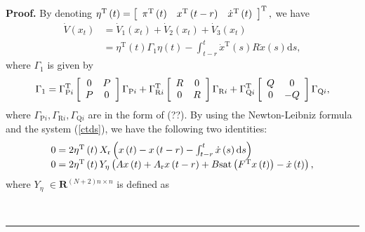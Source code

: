 \documentclass[9pt]{article}%
\newenvironment{proof}[1][Proof]{\noindent \textbf{#1.} }{\  \rule{0.5em}{0.5em}}
\begin{document}
\begin{proof}
By denoting $\eta^{\mathrm{T}}\left(  t\right)  =\left[
\begin{array}
[c]{ccc}%
\pi^{\mathrm{T}}\left(  t\right)  & x^{\mathrm{T}}\left(  t-r\right)  &
\dot{x}^{\mathrm{T}}\left(  t\right)
\end{array}
\right]  ^{\mathrm{T}},$ we have%
\begin{align}
\dot{V}\left(  x_{t}\right)   &  =\dot{V}_{1}\left(  x_{t}\right)  +\dot
{V}_{2}\left(  x_{t}\right)  +\dot{V}_{3}\left(  x_{t}\right) \nonumber \\
&  =\eta^{\mathrm{T}}\left(  t\right)  \Gamma_{1}\eta \left(  t\right)
-\int_{t-r}^{t}\dot{x}^{\mathrm{T}}\left(  s\right)  R\dot{x}\left(  s\right)
\mathrm{d}s, \label{eq19}%
\end{align}
where $\Gamma_{1}$ is given by%
\begin{equation}
\Gamma_{1}=\Gamma_{\mathrm{P}i}^{\mathrm{T}}\left[
\begin{array}
[c]{cc}%
0 & P\\
P & 0
\end{array}
\right]  \Gamma_{\mathrm{P}i}+\Gamma_{\mathrm{R}i}^{\mathrm{T}}\left[
\begin{array}
[c]{cc}%
R & 0\\
0 & R
\end{array}
\right]  \Gamma_{\mathrm{R}i}+\Gamma_{\mathrm{Q}i}^{\mathrm{T}}\left[
\begin{array}
[c]{cc}%
Q & 0\\
0 & -Q
\end{array}
\right]  \Gamma_{\mathrm{Q}i}, \label{eq30}%
\end{equation}
where $\Gamma_{\mathrm{P}i},\Gamma_{\mathrm{R}i},\Gamma_{\mathrm{Q}i}$ are in
the form of (??). By using the Newton-Leibniz formula and the system
(\ref{ctds}), we have the following two identities:%
\begin{equation}
\left.
\begin{array}
[c]{l}%
0=2\eta^{\mathrm{T}}\left(  t\right)  X_{\mathrm{r}}\left(  x\left(  t\right)
-x\left(  t-r\right)  -\int_{t-r}^{t}\dot{x}\left(  s\right)  \mathrm{d}%
s\right) \\
0=2\eta^{\mathrm{T}}\left(  t\right)  Y_{\eta}\left(  Ax\left(  t\right)
+A_{\mathrm{r}}x\left(  t-r\right)  +B\mathrm{sat}\left(  F^{\mathrm{T}%
}x\left(  t\right)  \right)  -\dot{x}\left(  t\right)  \right)  ,
\end{array}
\right.  \label{eq20}%
\end{equation}
where $Y_{\eta}$ $\in \mathbf{R}^{\left(  N+2\right)  n\times n}$ is defined as%

\end{proof}
\end{document}
